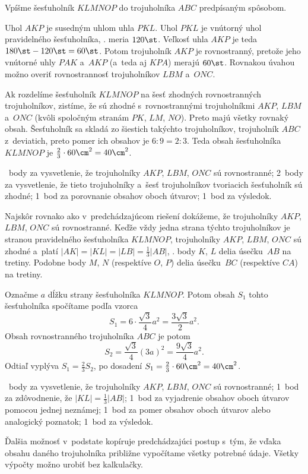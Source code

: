 {%
Vpíšme šesťuholník $KLMNOP$ do trojuholníka $ABC$ predpísaným spôsobom.
%

Uhol $AKP$ je susedným uhlom uhla $PKL$.
Uhol $PKL$ je vnútorný uhol pravidelného šesťuholníka, \tj. meria $120\st$.
Veľkosť uhla $AKP$ je teda $180\st - 120\st = 60\st$.
Potom trojuholník $AKP$ je rovnostranný, pretože jeho vnútorné uhly $PAK$
a~$AKP$ (a~teda aj $KPA$) merajú $60\st$.
Rovnakou úvahou možno overiť rovnostrannosť trojuholníkov $LBM$ a~$ONC$.

Ak rozdelíme šesťuholník $KLMNOP$ na šesť zhodných rovnostranných
trojuholníkov, zistíme, že sú zhodné s~rovnostrannými trojuholníkmi $AKP$,
$LBM$ a~$ONC$ (kvôli spoločným stranám $PK$, $LM$, $NO$).
Preto majú všetky rovnaký obsah.
Šesťuholník sa skladá zo šiestich takýchto trojuholníkov, trojuholník $ABC$
z~deviatich, preto pomer ich obsahov je $6:9 = 2:3$.
Teda obsah šesťuholníka $KLMNOP$ je $\frac23\cdot60\cm^2 = 40\cm^2$.

~body za vysvetlenie, že trojuholníky $AKP$, $LBM$, $ONC$ sú rovnostranné;
2~body za vysvetlenie, že tieto trojuholníky a~šesť trojuholníkov tvoriacich šesťuholník
sú zhodné;
1~bod za porovnanie obsahov oboch útvarov;
1~bod za výsledok.
\endhodnotenie

\ineriesenie
Najskôr rovnako ako v~predchádzajúcom riešení dokážeme, že trojuholníky $AKP$,
$LBM$, $ONC$ sú rovnostranné.
Keďže vždy jedna strana týchto trojuholníkov je stranou pravidelného
šesťuholníka $KLMNOP$, trojuholníky $AKP$, $LBM$, $ONC$ sú zhodné a~platí
$|AK| = |KL| = |LB| = \frac13|AB|$,
\tj. body $K$, $L$ delia úsečku~$AB$ na tretiny.
Podobne body $M$, $N$ (respektíve $O$, $P$) delia úsečku~$BC$ (respektíve
$CA$) na tretiny.

Označme $a$ dĺžku strany šesťuholníka $KLMNOP$.
Potom obsah $S_1$ tohto šesťuholníka spočítame podľa vzorca
$$
S_1=6\cdot\frac{\sqrt3}4a^2=\frac{3\sqrt3}2a^2.
$$
Obsah rovnostranného trojuholníka $ABC$ je potom
$$
S_2=\frac{\sqrt3}4(3a)^2=\frac{9\sqrt3}4a^2.
$$
Odtiaľ vyplýva $S_1=\frac23S_2$, po dosadení
$S_1=\frac23\cdot60\cm^2=40\cm^2$.

~body za vysvetlenie, že trojuholníky $AKP$, $LBM$, $ONC$ sú rovnostranné;
1~bod za zdôvodnenie, že $|KL|=\frac13|AB|$;
1~bod za vyjadrenie obsahov oboch útvarov pomocou jednej neznámej;
1~bod za pomer obsahov oboch útvarov alebo analogický poznatok;
1~bod za výsledok.
\endhodnotenie

\ineriesenie
Ďalšia možnosť v~podstate kopíruje predchádzajúci postup s~tým, že vďaka obsahu
daného trojuholníka približne vypočítame všetky potrebné údaje.
Všetky výpočty možno urobiť bez kalkulačky.

}
